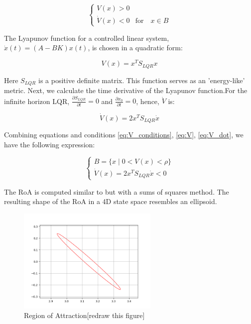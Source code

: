 \begin{equation}
\begin{cases}
   V(x) > 0 \\
   \dot{V}(x) < 0 & \text{for} \quad x \in B
\end{cases}
\label{eq:V_conditions}
\end{equation}

The Lyapunov function for a controlled linear system, \(\dot{x}(t) = (A - BK)x(t)\), is chosen in a quadratic form:

\begin{equation}
  V(x) = x^T S_{LQR} x 
  \label{eq:V}
\end{equation}

Here \(S_{LQR}\) is a positive definite matrix. This function serves as an 'energy-like' metric. Next, we calculate the time derivative of the Lyapunov function.For the infinite horizon LQR, \(\frac{\partial S_{LQR}}{\partial t} = 0\) and \(\frac{\partial x_0}{\partial t} = 0\), hence, \(\dot{V}\) is:

\begin{equation}
\dot{V}(x) = 2x^{T}S_{LQR}\dot{x}
\label{eq:V_dot}
\end{equation}

Combining equations and conditions \ref{eq:V_conditions}, \ref{eq:V}, \ref{eq:V_dot}, we have the following expression:

\begin{equation}
\begin{cases}
    B = \{ x \mid 0 < V(x) < \rho \} \\
    \dot{V}(x) = 2x^T S_{LQR} \dot{x} < 0
\end{cases}
\end{equation}

The RoA is computed similar to \cite{maywald2022co} but with a sums of squares method\cite{tedrake2010lqr}. The resulting shape of the RoA in a 4D state space resembles an ellipsoid.

\begin{figure}[H]
    \centering
    \includegraphics[width=0.6\textwidth]{figures/methodology/roaplot.png} %
    \caption{Region of Attraction[redraw this figure]}
    \label{fig:example}
\end{figure}

